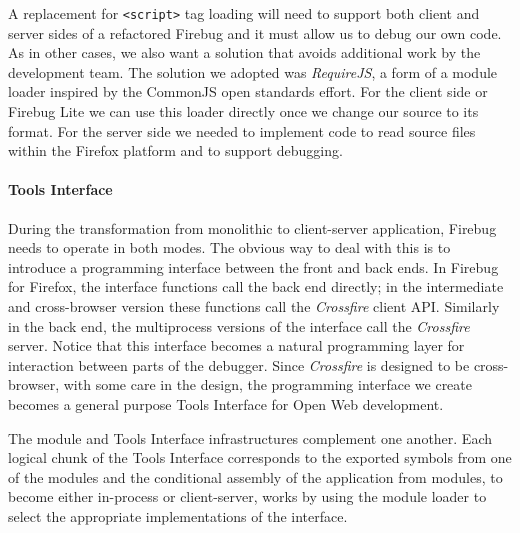 A replacement for  \texttt{<script>} tag loading will need to support both
client and server sides of a refactored Firebug and it must allow us to debug
our own code.  As in other cases, we also want a solution that avoids additional
work by the development team. The solution we adopted was
\textit{RequireJS}\cite{requirejs}, a form of a module loader inspired by the
CommonJS\cite{commonjs} open standards effort.  For the client side or Firebug
Lite we can use this loader directly once we change our source to its format.
For the server side we needed to implement code to read source files within the Firefox
platform and to support debugging.


\paragraph{Tools Interface}
During the transformation from monolithic to client-server application, Firebug
needs to operate in both modes. The obvious way to deal with this is to
introduce a programming interface between the front and back ends. In Firebug
for Firefox, the interface functions call the back end directly; in the
intermediate and cross-browser version these functions
call the \textit{Crossfire} client API.  Similarly in the back end, the
multiprocess versions of the interface call the \textit{Crossfire} server.
Notice that this interface becomes a natural programming layer for interaction
between parts of the debugger. Since \textit{Crossfire} is designed to be
cross-browser, with some care in the design, the programming interface we create
becomes a general purpose Tools Interface for Open Web development.


The module and Tools Interface infrastructures complement one another. Each
logical chunk of the Tools Interface corresponds to the exported symbols from
one of the modules and the conditional assembly of the application from modules,
to become either in-process or client-server, works by using the module loader
to select the appropriate implementations of the interface.

